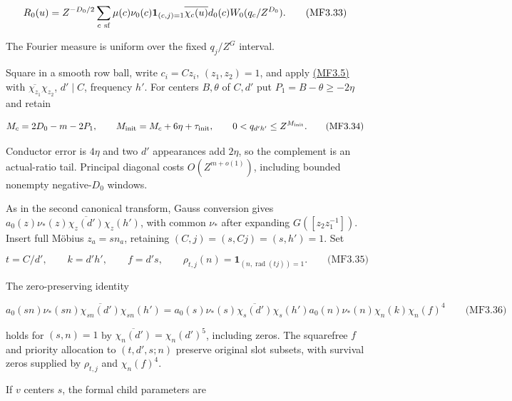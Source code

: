 \hypertarget{mf:eq:B3.33}{}

\label{mf:eq:B3.33}

\[
R_0(u)=Z^{-D_0/2}\sum_{c\ {\rm sf}}\mu(c)\nu_0(c)
 \mathbf1_{(c,j)=1}\overline{\chi_c(u)}d_0(c)W_0(q_c/Z^{D_0}).
\qquad\text{(MF3.33)}
\]

The Fourier measure is uniform over the fixed \(q_j/Z^G\) interval.

Square in a smooth row ball, write \(c_i=Cz_i\), \((z_1,z_2)=1\), and apply \protect\hyperlink{mf:eq:B3.5}{(MF3.5)} with \(\overline{\chi_{z_1}}\chi_{z_2}\), \(d'\mid C\), frequency \(h'\). For centers \(B,\theta\) of \(C,d'\) put \(P_1=B-\theta\ge-2\eta\) and retain

\hypertarget{mf:eq:B3.34}{}

\label{mf:eq:B3.34}

\[
M_c=2D_0-m-2P_1,\qquad M_{\rm init}=M_c+6\eta+\tau_{\rm init},
\qquad0<q_{d'h'}\le Z^{M_{\rm init}}.
\qquad\text{(MF3.34)}
\]

Conductor error is \(4\eta\) and two \(d'\) appearances add \(2\eta\), so the complement is an actual-ratio tail. Principal diagonal costs \(O(Z^{m+o(1)})\), including bounded nonempty negative-\(D_0\) windows.

As in the second canonical transform, Gauss conversion gives \(a_0(z)\nu_*(z)\overline{\chi_z(d')}\chi_z(h')\), with common \(\nu_*\) after expanding \(G([z_2z_1^{-1}])\). Insert full Möbius \(z_a=sn_a\), retaining \((C,j)=(s,Cj)=(s,h')=1\). Set

\hypertarget{mf:eq:B3.35}{}

\label{mf:eq:B3.35}

\[
t=C/d',\qquad k=d'h',\qquad f=d's,\qquad
\rho_{t,j}(n)=\mathbf1_{(n,\operatorname{rad}(tj))=1}.
\qquad\text{(MF3.35)}
\]

The zero-preserving identity

\hypertarget{mf:eq:B3.36}{}

\label{mf:eq:B3.36}

\[
a_0(sn)\nu_*(sn)\overline{\chi_{sn}(d')}\chi_{sn}(h')
=a_0(s)\nu_*(s)\overline{\chi_s(d')}\chi_s(h')
 a_0(n)\nu_*(n)\chi_n(k)\chi_n(f)^4
\qquad\text{(MF3.36)}
\]

holds for \((s,n)=1\) by \(\overline{\chi_n(d')}=\chi_n(d')^5\), including zeros. The squarefree \(f\) and priority allocation to \((t,d',s;n)\) preserve original slot subsets, with survival zeros supplied by \(\rho_{t,j}\) and \(\chi_n(f)^4\).

If \(v\) centers \(s\), the formal child parameters are


